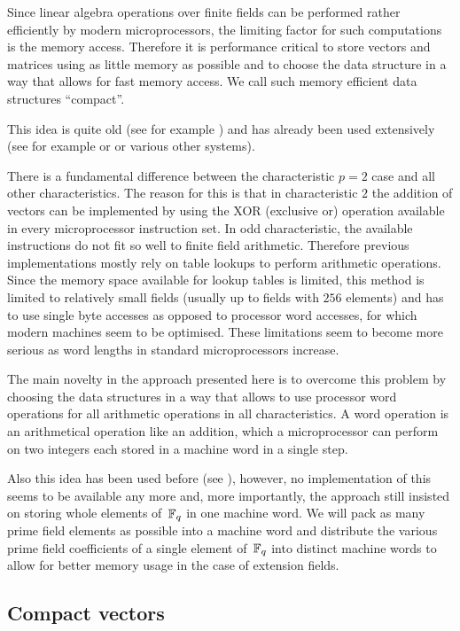 Since linear algebra operations over finite fields can be performed
rather efficiently by modern microprocessors, the limiting factor 
for such computations is the memory access. Therefore it is performance
critical to store vectors and matrices using as little memory as possible
and to choose the data structure in a way that allows for fast memory
access. We call such memory efficient data structures ``compact''.

This idea is quite old (see for example \cite{MeatAxeRP}) and has already 
been used extensively (see for example \cite{CMeatAxe} or \cite{GAP4} or
various other systems).

There is a fundamental difference between the characteristic $p=2$ case
and all other characteristics. The reason for this is that in
characteristic $2$ the addition of vectors can be implemented by using
the XOR (exclusive or) operation available in every microprocessor
instruction set. In odd characteristic, the available instructions
do not fit so well to finite field arithmetic. Therefore previous
implementations mostly rely on table lookups to perform arithmetic
operations. Since the memory space available for lookup tables is
limited, this method is limited to relatively small fields (usually up to
fields with $256$ elements) and has to use single byte accesses
as opposed to processor word accesses, for which modern machines
seem to be optimised. These limitations seem to become more serious
as word lengths in standard microprocessors increase.

The main novelty in the approach presented here is to overcome this
problem by choosing the data structures in a way that allows to use
processor word operations for all arithmetic operations in all
characteristics. A word operation is an arithmetical operation like an
addition, which a microprocessor can perform on two integers each stored in a
machine word in a single step.

Also this idea has been used before (see
\cite{EssenLinAlg}), however, no implementation of this seems to
be available any more and, more importantly, the approach still
insisted on storing whole elements of\, $\mathbb{F}_q$ in one machine word.
We will pack as many prime field elements as possible into a machine
word and distribute the various prime field coefficients of a single
element of\, $\mathbb{F}_q$ into distinct machine words to allow for better
memory usage in the case of extension fields.


\subsection{Compact vectors}
\label{ssec:cvec}

